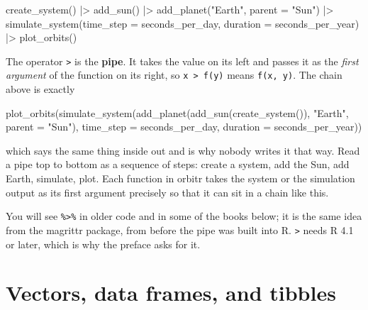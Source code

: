 \documentclass[
  10.5pt,
  letterpaper,
]{scrbook}
\newenvironment{Shaded}{\begin{snugshade}}{\end{snugshade}}
\newcommand{\AttributeTok}[1]{\textcolor[rgb]{0.00,0.00,0.00}{#1}}
\newcommand{\FunctionTok}[1]{\textcolor[rgb]{0.00,0.00,0.00}{#1}}
\newcommand{\NormalTok}[1]{\textcolor[rgb]{0.00,0.00,0.00}{#1}}
\newcommand{\SpecialCharTok}[1]{\textcolor[rgb]{0.00,0.00,0.00}{#1}}
\newcommand{\StringTok}[1]{\textcolor[rgb]{0.00,0.00,0.00}{#1}}
\theoremstyle{plain}
\theoremstyle{remark}
\begin{document}
\begin{Shaded}
\begin{Highlighting}[]
\FunctionTok{create\_system}\NormalTok{() }\SpecialCharTok{|\textgreater{}}
  \FunctionTok{add\_sun}\NormalTok{() }\SpecialCharTok{|\textgreater{}}
  \FunctionTok{add\_planet}\NormalTok{(}\StringTok{"Earth"}\NormalTok{, }\AttributeTok{parent =} \StringTok{"Sun"}\NormalTok{) }\SpecialCharTok{|\textgreater{}}
  \FunctionTok{simulate\_system}\NormalTok{(}\AttributeTok{time\_step =}\NormalTok{ seconds\_per\_day, }\AttributeTok{duration =}\NormalTok{ seconds\_per\_year) }\SpecialCharTok{|\textgreater{}}
  \FunctionTok{plot\_orbits}\NormalTok{()}
\end{Highlighting}
\end{Shaded}

The operator \texttt{\textbar{}\textgreater{}} is the \textbf{pipe}. It
takes the value on its left and passes it as the \emph{first argument}
of the function on its right, so
\texttt{x\ \textbar{}\textgreater{}\ f(y)} means \texttt{f(x,\ y)}. The
chain above is exactly

\begin{Shaded}
\begin{Highlighting}[]
\FunctionTok{plot\_orbits}\NormalTok{(}\FunctionTok{simulate\_system}\NormalTok{(}\FunctionTok{add\_planet}\NormalTok{(}\FunctionTok{add\_sun}\NormalTok{(}\FunctionTok{create\_system}\NormalTok{()), }\StringTok{"Earth"}\NormalTok{, }\AttributeTok{parent =} \StringTok{"Sun"}\NormalTok{),}
                            \AttributeTok{time\_step =}\NormalTok{ seconds\_per\_day, }\AttributeTok{duration =}\NormalTok{ seconds\_per\_year))}
\end{Highlighting}
\end{Shaded}

which says the same thing inside out and is why nobody writes it that
way. Read a pipe top to bottom as a sequence of steps: create a system,
add the Sun, add Earth, simulate, plot. Each function in orbitr takes
the system or the simulation output as its first argument precisely so
that it can sit in a chain like this.

You will see \texttt{\%\textgreater{}\%} in older code and in some of
the books below; it is the same idea from the magrittr package, from
before the pipe was built into R. \texttt{\textbar{}\textgreater{}}
needs R 4.1 or later, which is why the preface asks for it.

\section{Vectors, data frames, and
tibbles}\label{vectors-data-frames-and-tibbles}
\end{document}
